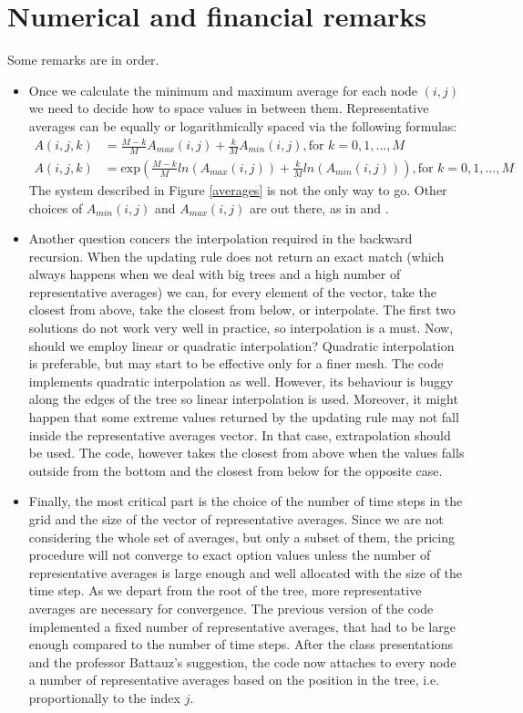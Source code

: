 \documentclass[12pt]{article}
\numberwithin{equation}{section}
\begin{document}
\section{Numerical and financial remarks}
Some remarks are in order.
\begin{itemize}
\item Once we calculate the minimum and maximum average for each node $(i,j)$ we need to decide how to space values in between them. Representative averages can be equally or logarithmically spaced via the following formulas:
\begin{align*}
A(i,j,k) &= \frac{M-k}{M}A_{max}(i,j) + \frac{k}{M}A_{min}(i,j), \text{for } k = 0,1,...,M \\
A(i,j,k) &= \text{exp} \left( \frac{M-k}{M}ln(A_{max}(i,j)) + \frac{k}{M}ln(A_{min}(i,j)) \right ), \text{for } k = 0,1,...,M
\end{align*}
The system described in Figure \ref{averages} is not the only way to go. Other choices of $A_{min}(i,j)$ and $A_{max}(i,j)$ are out there, as in \cite{Barraquand} and \cite{Klassen}. 
\item Another question concers the interpolation required in the backward recursion. When the updating rule does not return an exact match (which always happens when we deal with big trees and a high number of representative averages) we can, for every element of the vector, take the closest from above, take the closest from below, or interpolate. The first two solutions do not work very well in practice, so interpolation is a must. Now, should we employ linear or quadratic interpolation? Quadratic interpolation is preferable, but may start to be effective only for a finer mesh. The code implements quadratic interpolation as well. However, its behaviour is buggy along the edges of the tree so linear interpolation is used. Moreover, it might happen that some extreme values returned by the updating rule may not fall inside the representative averages vector. In that case, extrapolation should be used. The code, however takes the closest from above when the values falls outside from the bottom and the closest from below for the opposite case.
\item Finally, the most critical part is the choice of the number of time steps in the grid and the size of the vector of representative averages. Since we are not considering the whole set of averages, but only a subset of them, the pricing procedure will not converge to exact option values unless the number of representative averages is large enough and well allocated with the size of the time step. As we depart from the root of the tree, more representative averages are necessary for convergence. The previous version of the code implemented a fixed number of representative averages, that had to be large enough compared to the number of time steps. After the class presentations and the professor Battauz's suggestion, the code now attaches to every node a number of representative averages based on the position in the tree, i.e. proportionally to the index $j$.

\end{itemize}
\end{document}
